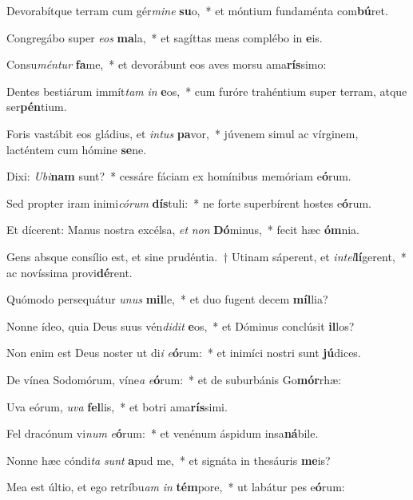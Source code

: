 \item Devorabítque terram cum gér\textit{mi}\textit{ne} \textbf{su}o,~* et móntium fundaménta com\textbf{bú}ret.
\item Congregábo super \textit{e}\textit{os} \textbf{ma}la,~* et sagíttas meas complébo in \textbf{e}is.
\item Consu\textit{mén}\textit{tur} \textbf{fa}me,~* et devorábunt eos aves morsu ama\textbf{rís}simo:
\item Dentes bestiárum immít\textit{tam} \textit{in} \textbf{e}os,~* cum furóre trahéntium super terram, atque ser\textbf{pén}tium.
\item Foris vastábit eos gládius, et \textit{in}\textit{tus} \textbf{pa}vor,~* júvenem simul ac vírginem, lacténtem cum hómine \textbf{se}ne.
\item Dixi: \textit{U}\textit{bi}\textbf{nam} sunt?~* cessáre fáciam ex homínibus memóriam e\textbf{ó}rum.
\item Sed propter iram inimi\textit{có}\textit{rum} \textbf{dís}tuli:~* ne forte superbírent hostes e\textbf{ó}rum.
\item Et dícerent: Manus nostra excélsa, \textit{et} \textit{non} \textbf{Dó}minus,~* fecit hæc \textbf{óm}nia.
\item Gens absque consílio est, et sine prudéntia.~† Utinam sáperent, et \textit{in}\textit{tel}\textbf{lí}gerent,~* ac novíssima provi\textbf{dé}rent.
\item Quómodo persequátur \textit{u}\textit{nus} \textbf{mil}le,~* et duo fugent decem \textbf{míl}lia?
\item Nonne ídeo, quia Deus suus vén\textit{di}\textit{dit} \textbf{e}os,~* et Dóminus conclúsit \textbf{il}los?
\item Non enim est Deus noster ut di\textit{i} \textit{e}\textbf{ó}rum:~* et inimíci nostri sunt \textbf{jú}dices.
\item De vínea Sodomórum, víne\textit{a} \textit{e}\textbf{ó}rum:~* et de suburbánis Go\textbf{mór}rhæ:
\item Uva eórum, \textit{u}\textit{va} \textbf{fel}lis,~* et botri ama\textbf{rís}simi.
\item Fel dracónum vi\textit{num} \textit{e}\textbf{ó}rum:~* et venénum áspidum insa\textbf{ná}bile.
\item Nonne hæc cóndi\textit{ta} \textit{sunt} \textbf{a}pud me,~* et signáta in thesáuris \textbf{me}is?
\item Mea est últio, et ego retríbu\textit{am} \textit{in} \textbf{tém}pore,~* ut labátur pes e\textbf{ó}rum:
